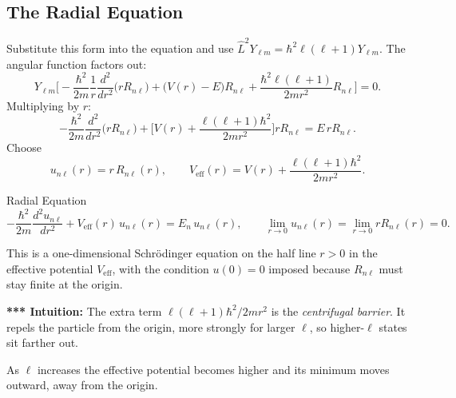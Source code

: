 \documentclass[11pt,a4paper]{article}
\begin{document}
\subsection{The Radial Equation}
Substitute this form into the equation and use $\hat L^2Y_{\ell m}=\hbar^2\ell(\ell+1)Y_{\ell m}$. The angular function factors out:
\[
Y_{\ell m}\Big[-\frac{\hbar^2}{2m}\frac1r\frac{d^2}{dr^2}\big(rR_{n\ell}\big)+\big(V(r)-E\big)R_{n\ell}+\frac{\hbar^2\ell(\ell+1)}{2mr^2}R_{n\ell}\Big]=0 .
\]
Multiplying by $r$:
\[
-\frac{\hbar^2}{2m}\frac{d^2}{dr^2}\big(rR_{n\ell}\big)+\Big[V(r)+\frac{\ell(\ell+1)\hbar^2}{2mr^2}\Big]rR_{n\ell}=E\,rR_{n\ell}.
\]
Choose
\[
u_{n\ell}(r)=r\,R_{n\ell}(r),\qquad V_{\mathrm{eff}}(r)=V(r)+\frac{\ell(\ell+1)\hbar^2}{2mr^2}.
\]

\begin{thm}{Radial Equation}
\[
-\frac{\hbar^2}{2m}\frac{d^2u_{n\ell}}{dr^2}+V_{\mathrm{eff}}(r)\,u_{n\ell}(r)=E_n\,u_{n\ell}(r),\qquad \lim_{r\to0}u_{n\ell}(r)=\lim_{r\to0}rR_{n\ell}(r)=0 .
\]
\end{thm}

This is a one-dimensional Schr\"odinger equation on the half line $r>0$ in the effective potential $V_{\mathrm{eff}}$, with the condition $u(0)=0$ imposed because $R_{n\ell}$ must stay finite at the origin.

\textbf{*** Intuition:} The extra term $\ell(\ell+1)\hbar^2/2mr^2$ is the \emph{centrifugal barrier}. It repels the particle from the origin, more strongly for larger $\ell$, so higher-$\ell$ states sit farther out.

\begin{center}
\end{center}
As $\ell$ increases the effective potential becomes higher and its minimum moves outward, away from the origin.
\end{document}
